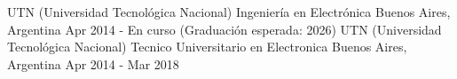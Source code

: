 

\begin{cventries}

  \cventry
    {UTN (Universidad Tecnológica Nacional)} %
    {Ingeniería en Electrónica} %
    {Buenos Aires, Argentina} %
    {Apr 2014 - En curso (Graduación esperada: 2026)} %
    {}
  \cventry
    {UTN (Universidad Tecnológica Nacional)} %
    {Tecnico Universitario en Electronica} %
    {Buenos Aires, Argentina} %
    {Apr 2014 - Mar 2018} %
    {}
\end{cventries}